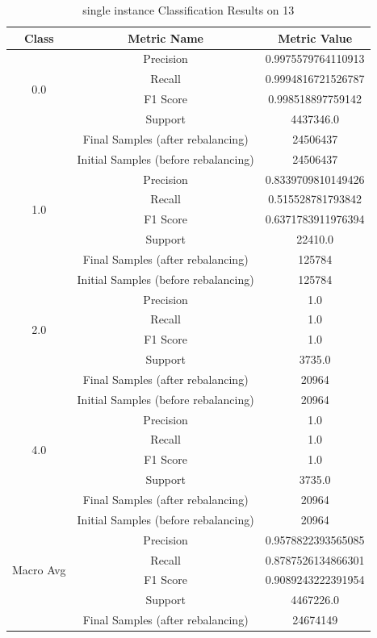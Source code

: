 \begin{longtable}{|c|c|c|}
\caption{single instance Classification Results on 13} \label{tab:13_single_instance_classifiers_results} \\
\hline
Class & Metric Name & Metric Value \\
\hline
\multirow{4}{*}{0.0} & Precision & 0.9975579764110913 \\
 & Recall & 0.9994816721526787 \\
 & F1 Score & 0.998518897759142 \\
 & Support & 4437346.0 \\
 & Final Samples (after rebalancing) & 24506437 \\
 & Initial Samples (before rebalancing) & 24506437 \\
\hline
\multirow{4}{*}{1.0} & Precision & 0.8339709810149426 \\
 & Recall & 0.515528781793842 \\
 & F1 Score & 0.6371783911976394 \\
 & Support & 22410.0 \\
 & Final Samples (after rebalancing) & 125784 \\
 & Initial Samples (before rebalancing) & 125784 \\
\hline
\multirow{4}{*}{2.0} & Precision & 1.0 \\
 & Recall & 1.0 \\
 & F1 Score & 1.0 \\
 & Support & 3735.0 \\
 & Final Samples (after rebalancing) & 20964 \\
 & Initial Samples (before rebalancing) & 20964 \\
\hline
\multirow{4}{*}{4.0} & Precision & 1.0 \\
 & Recall & 1.0 \\
 & F1 Score & 1.0 \\
 & Support & 3735.0 \\
 & Final Samples (after rebalancing) & 20964 \\
 & Initial Samples (before rebalancing) & 20964 \\
\hline
\multirow{4}{*}{Macro Avg} & Precision & 0.9578822393565085 \\
 & Recall & 0.8787526134866301 \\
 & F1 Score & 0.9089243222391954 \\
 & Support & 4467226.0 \\
 & Final Samples (after rebalancing) & 24674149 \\

\end{longtable}
